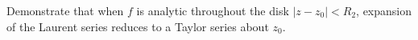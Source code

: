 \begin{problem}{1}
    Demonstrate that when $f$ is analytic throughout the disk $|z - z_0| < R_2$, expansion of the Laurent series reduces to a Taylor series about $z_0$.
\end{problem}